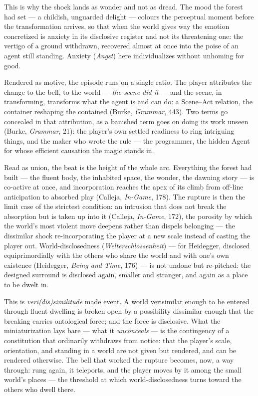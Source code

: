 \documentclass{article}
\begin{document}
This is why the shock lands as wonder and not as dread. The mood the forest had set — a childish, unguarded delight — colours the perceptual moment before the transformation arrives, so that when the world gives way the emotion concretized is anxiety in its disclosive register and not its threatening one: the vertigo of a ground withdrawn, recovered almost at once into the poise of an agent still standing. Anxiety (\textit{Angst}) here individualizes without unhoming for good.

Rendered as motive, the episode runs on a single ratio. The player attributes the change to the bell, to the world — \textit{the scene did it} — and the scene, in transforming, transforms what the agent is and can do: a Scene–Act relation, the container reshaping the contained (Burke, \textit{Grammar}, 443). Two terms go concealed in that attribution, as a banished term goes on doing its work unseen (Burke, \textit{Grammar}, 21): the player's own settled readiness to ring intriguing things, and the maker who wrote the rule — the programmer, the hidden Agent for whose efficient causation the magic stands in.

Read as union, the beat is the height of the whole arc. Everything the forest had built — the fluent body, the inhabited space, the wonder, the dawning story — is co-active at once, and incorporation reaches the apex of its climb from off-line anticipation to absorbed play (Calleja, \textit{In-Game}, 178). The rupture is then the limit case of the strictest condition: an intrusion that does not break the absorption but is taken up into it (Calleja, \textit{In-Game}, 172), the porosity by which the world's most violent move deepens rather than dispels belonging — the dissimilar shock re-incorporating the player at a new scale instead of casting the player out. World-disclosedness (\textit{Welterschlossenheit}) — for Heidegger, disclosed equiprimordially with the others who share the world and with one's own existence (Heidegger, \textit{Being and Time}, 176) — is not undone but re-pitched: the designed surround is disclosed again, smaller and stranger, and again as a place to be dwelt in.

This is \textit{veri(dis)similitude} made event. A world verisimilar enough to be entered through fluent dwelling is broken open by a possibility dissimilar enough that the breaking carries ontological force; and the force is disclosive. What the miniaturization lays bare — what it \textit{unconceals} — is the contingency of a constitution that ordinarily withdraws from notice: that the player's scale, orientation, and standing in a world are not given but rendered, and can be rendered otherwise. The bell that worked the rupture becomes, now, a way through: rung again, it teleports, and the player moves by it among the small world's places — the threshold at which world-disclosedness turns toward the others who dwell there.
\end{document}
